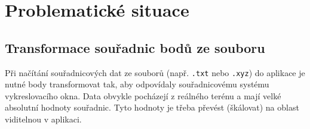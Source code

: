 \section{Problematické situace}

\subsection{Transformace souřadnic bodů ze souboru}

Při načítání souřadnicových dat ze souborů (např. \texttt{.txt} nebo \texttt{.xyz}) do aplikace je nutné body transformovat tak, aby odpovídaly souřadnicovému systému vykreslovacího okna. Data obvykle pocházejí z reálného terénu a mají velké absolutní hodnoty souřadnic. Tyto hodnoty je třeba převést (škálovat) na oblast viditelnou v aplikaci.

